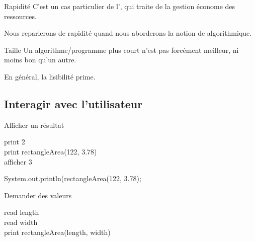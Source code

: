 \begin{hideedit}
\begin{frame}{Rapidité}
  \pause
  C'est un cas particulier de l', qui traite de la
  gestion économe des ressources.

  Nous reparlerons de rapidité quand nous aborderons la notion de
   algorithmique.

\end{frame}

\begin{frame}{Taille}
  Un algorithme/programme plus court n'est pas forcément meilleur, ni moins
  bon qu'un autre.

  En général, \alert{la lisibilité prime}.
\end{frame}


\subsection{Interagir avec l'utilisateur}
\begin{frame}[fragile]{Afficher un résultat}
  \begin{langagenaturel}
print 2\\
print rectangleArea(122, 3.78)\\

afficher 3
  \end{langagenaturel}

  \pause
  \begin{center}
  \end{center}

  \pause
  \begin{java}
System.out.println(rectangleArea(122, 3.78);
  \end{java}
\end{frame}

\begin{frame}[fragile]{Demander des valeurs}
  \begin{langagenaturel}
    read length\\
    read width\\
    print rectangleArea(length, width)\\


\end{langagenaturel}
\end{frame}
\end{hideedit}
